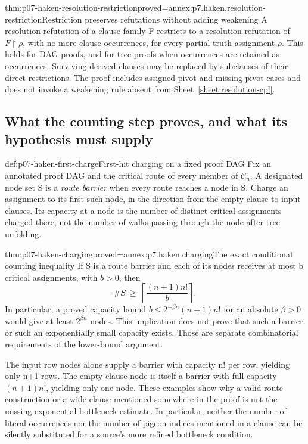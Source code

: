\begin{hbtheorem}{thm:p07-haken-resolution-restriction}{proved=annex:p7.haken.resolution-restriction}{Restriction preserves refutations without adding weakening}
A resolution refutation of a clause family F restricts to a
resolution refutation of \(F\upharpoonright\rho\), with no
more clause occurrences, for every partial truth assignment
\(\rho\). This holds for DAG proofs, and for tree proofs
when occurrences are retained as occurrences. Surviving derived
clauses may be replaced by subclauses of their direct restrictions.
The proof includes assigned-pivot and missing-pivot cases and
does not invoke a weakening rule absent from
Sheet~\ref{sheet:resolution-cpl}.
\end{hbtheorem}

\subsection{What the counting step proves, and what its hypothesis must supply}

\begin{hbdefinition}{def:p07-haken-first-charge}{First-hit charging on a fixed proof DAG}
Fix an annotated proof DAG and the critical route of every member
of \(\mathcal C_n\). A designated node set S is a \emph{route
barrier} when every route reaches a node in S. Charge an assignment
to its first such node, in the direction from the empty clause
to input clauses. Its capacity at a node is the number of distinct
critical assignments charged there, not the number of walks
passing through the node after tree unfolding.
\end{hbdefinition}

\begin{hbtheorem}{thm:p07-haken-charging}{proved=annex:p7.haken.charging}{The exact conditional counting inequality}
If S is a route barrier and each of its nodes receives at most b
critical assignments, with \(b>0\), then
\[
 \#S\ \geq\ \left\lceil\frac{(n+1)n!}{b}\right\rceil.
\]
In particular, a proved capacity bound
\(b\leq2^{-\beta n}(n+1)n!\) for an absolute
\(\beta>0\) would give at least \(2^{\beta n}\) nodes.
This implication does not prove that such a barrier or such
an exponentially small capacity exists. Those are separate
combinatorial requirements of the lower-bound argument.
\end{hbtheorem}

The input row nodes alone supply a barrier with capacity n! per
row, yielding only n+1 rows. The empty-clause node is itself a
barrier with full capacity \((n+1)n!\), yielding only one node.
These examples show why a valid route construction or a wide
clause mentioned somewhere in the proof is not the missing
exponential bottleneck estimate. In particular, neither the
number of literal occurrences nor the number of pigeon indices
mentioned in a clause can be silently substituted for a source's
more refined bottleneck condition.

